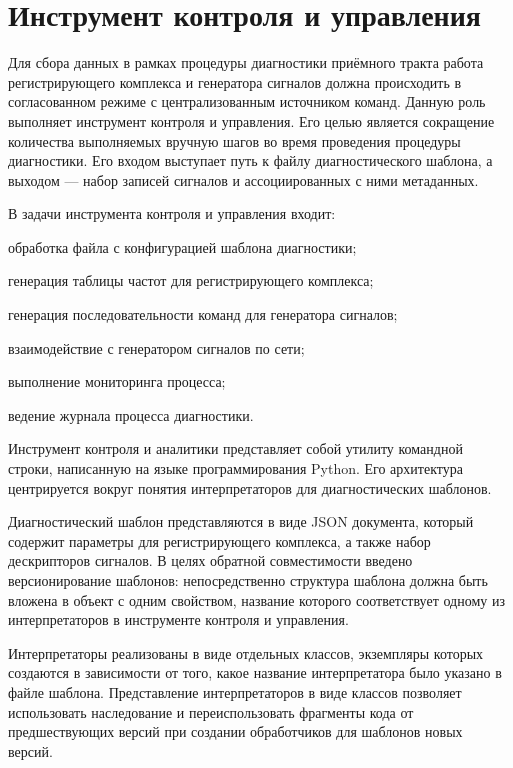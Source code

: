 \documentclass{report}
\begin{document}
\section{Инструмент контроля и управления}

Для сбора данных в рамках процедуры диагностики приёмного тракта работа регистрирующего комплекса и генератора сигналов должна происходить в согласованном режиме с централизованным источником команд. Данную роль выполняет инструмент контроля и управления. Его целью является сокращение количества выполняемых вручную шагов во время проведения процедуры диагностики. Его входом выступает путь к файлу диагностического шаблона, а выходом --- набор записей сигналов и ассоциированных с ними метаданных.

В задачи инструмента контроля и управления входит:

\begin{enummarker}
    \item обработка файла с конфигурацией шаблона диагностики;
    \item генерация таблицы частот для регистрирующего комплекса;
    \item генерация последовательности команд для генератора сигналов;
    \item взаимодействие с генератором сигналов по сети;
    \item выполнение мониторинга процесса;
    \item ведение журнала процесса диагностики.
\end{enummarker}

Инструмент контроля и аналитики представляет собой утилиту командной строки, написанную на языке программирования Python. Его архитектура центрируется вокруг понятия интерпретаторов для диагностических шаблонов.

Диагностический шаблон представляются в виде JSON документа, который содержит параметры для регистрирующего комплекса, а также набор дескрипторов сигналов. В целях обратной совместимости введено версионирование шаблонов: непосредственно структура шаблона должна быть вложена в объект с одним свойством, название которого соответствует одному из интерпретаторов в инструменте контроля и управления.

Интерпретаторы реализованы в виде отдельных классов, экземпляры которых создаются в зависимости от того, какое название интерпретатора было указано в файле шаблона. Представление интерпретаторов в виде классов позволяет использовать наследование и переиспользовать фрагменты кода от предшествующих версий при создании обработчиков для шаблонов новых версий.
\end{document}
